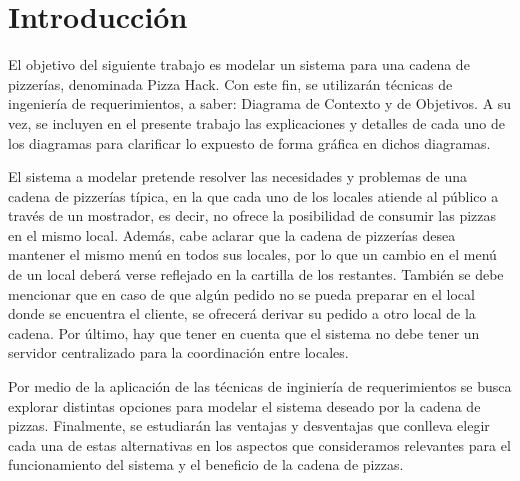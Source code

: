 \documentclass[a4paper,11pt] {article}
\begin{document}
\grupo{}

\maketitle

\bigskip

\section*{Introducci\'on}

El objetivo del siguiente trabajo es modelar un sistema para una cadena de pizzer\'ias, denominada Pizza Hack. Con este fin, se utilizar\'an t\'ecnicas de ingenier\'ia de requerimientos, a saber: Diagrama de Contexto y de Objetivos. A su vez, se incluyen en el presente trabajo las explicaciones y detalles de cada uno de los diagramas para clarificar lo expuesto de forma gr\'afica en dichos diagramas. 

El sistema a modelar pretende resolver las necesidades y problemas de una cadena de pizzer\'ias t\'ipica, en la que cada uno de los locales atiende al p\'ublico a trav\'es de un mostrador, es decir, no ofrece la posibilidad de consumir las pizzas en el mismo local. Adem\'as, cabe aclarar que la cadena de pizzer\'ias desea mantener el mismo men\'u en todos sus locales, por lo que un cambio en el men\'u de un local deber\'a verse reflejado en la cartilla de los restantes. Tambi\'en se debe mencionar que en caso de que alg\'un pedido no se pueda preparar en el local donde se encuentra el cliente, se ofrecer\'a derivar su pedido a otro local de la cadena. Por \'ultimo, hay que tener en cuenta que el sistema no debe tener un servidor centralizado para la coordinaci\'on entre locales.

Por medio de la aplicaci\'on de las t\'ecnicas de inginier\'ia de requerimientos se busca explorar distintas opciones para modelar el sistema deseado por la cadena de pizzas. Finalmente, se estudiar\'an las ventajas y desventajas que conlleva elegir cada una de estas alternativas en los aspectos que consideramos relevantes para el funcionamiento del sistema y el beneficio de la cadena de pizzas.  
\end{document}
